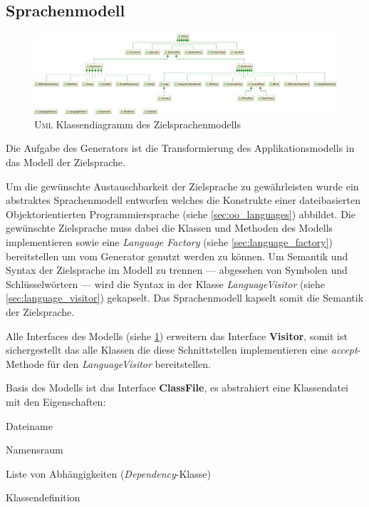 \subsection{Sprachenmodell}
\label{sec:language_model}

\begin{figure}
    \centering
    \includegraphics[width=\textheight]{resources/languagemodel_common}
    \caption{\textsc{Uml} Klassendiagramm des Zielsprachenmodells}
    \label{fig:language_model}
\end{figure}

Die Aufgabe des Generators ist die Transformierung des Applikationsmodells in das Modell der Zielsprache. 

Um die gewünschte Austauschbarkeit der Zielsprache zu gewährleisten wurde ein abstraktes Sprachenmodell entworfen welches die Konstrukte einer dateibasierten Objektorientierten Programmiersprache (siehe \cref{sec:oo_languages}) abbildet. 
Die gewünschte Zielsprache muss dabei die Klassen und Methoden des Modells implementieren sowie eine \emph{Language Factory} (siehe \cref{sec:language_factory}) bereitstellen um vom Generator genutzt werden zu können.
Um Semantik und Syntax der Zielsprache im Modell zu trennen --- abgesehen von Symbolen und Schlüsselwörtern --- wird die Syntax in der Klasse \emph{LanguageVisitor} (siehe \cref{sec:language_visitor}) gekapselt. Das Sprachenmodell kapselt somit die Semantik der Zielsprache.

Alle Interfaces des Modells (siehe \cref{fig:language_model}) erweitern das Interface \textbf{Visitor}, somit ist sichergestellt das alle Klassen die diese Schnittstellen implementieren eine \emph{accept}-Methode für den \emph{LanguageVisitor} bereitstellen.

Basis des Modells ist das Interface \textbf{ClassFile}, es abstrahiert eine Klassendatei mit den Eigenschaften:
\begin{compactitem}
    \item Dateiname
    \item Namensraum
    \item Liste von Abhängigkeiten (\emph{Dependency}-Klasse)
    \item Klassendefinition
\end{compactitem}

